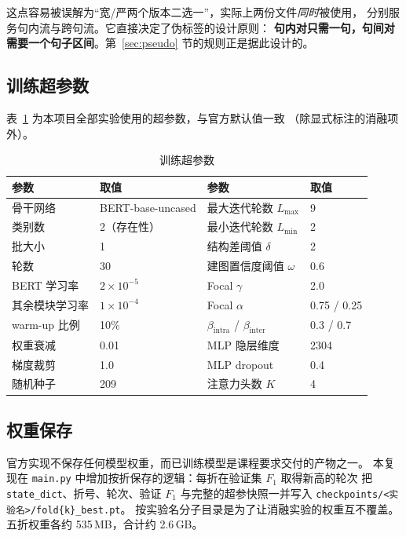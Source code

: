 这点容易被误解为“宽/严两个版本二选一”，实际上两份文件\emph{同时}被使用，
分别服务句内流与跨句流。它直接决定了伪标签的设计原则：
\textbf{句内对只需一句，句间对需要一个句子区间}。第~\ref{sec:pseudo} 节的规则正是据此设计的。

\subsection{训练超参数}

表~\ref{tab:hparam} 为本项目全部实验使用的超参数，与官方默认值一致
（除显式标注的消融项外）。

\begin{table}[H]
\centering
\caption{训练超参数}
\label{tab:hparam}
\small
\begin{tabular}{llll}
\toprule
参数 & 取值 & 参数 & 取值\\
\midrule
骨干网络 & BERT-base-uncased & 最大迭代轮数 $L_{\max}$ & 9\\
类别数 & 2（存在性） & 最小迭代轮数 $L_{\min}$ & 2\\
批大小 & 1 & 结构差阈值 $\delta$ & 2\\
轮数 & 30 & 建图置信度阈值 $\omega$ & 0.6\\
BERT 学习率 & $2\times10^{-5}$ & Focal $\gamma$ & 2.0\\
其余模块学习率 & $1\times10^{-4}$ & Focal $\alpha$ & 0.75 / 0.25\\
warm-up 比例 & 10\% & $\beta_{\text{intra}}$ / $\beta_{\text{inter}}$ & 0.3 / 0.7\\
权重衰减 & 0.01 & MLP 隐层维度 & 2304\\
梯度裁剪 & 1.0 & MLP dropout & 0.4\\
随机种子 & 209 & 注意力头数 $K$ & 4\\
\bottomrule
\end{tabular}
\end{table}

\subsection{权重保存}

官方实现不保存任何模型权重，而已训练模型是课程要求交付的产物之一。
本复现在 \texttt{main.py} 中增加按折保存的逻辑：每折在验证集 $F_1$ 取得新高的轮次
把 \texttt{state\_dict}、折号、轮次、验证 $F_1$ 与完整的超参快照一并写入
\texttt{checkpoints/<实验名>/fold\{k\}\_best.pt}。
按实验名分子目录是为了让消融实验的权重互不覆盖。
五折权重各约 535\,MB，合计约 2.6\,GB。
